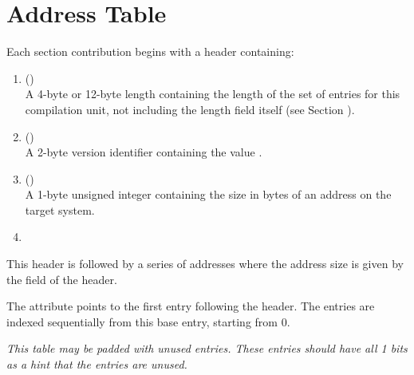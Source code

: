 \section{Address Table}
\label{datarep:addresstable}
Each 
\bb
\dotdebugaddr{} section contribution
\eb
begins with a header containing:
\begin{enumerate}[1. ]
\item \HFNunitlength{} () \\
A 4-byte or 12-byte length containing the length of
the set of entries for this compilation unit, not
including the length field itself
\bb
(see Section ).
\eb

\item  \HFNversion{} (\HFTuhalf) \\
A 2-byte version identifier containing the value
\versiondotdebugaddr{}.

\item	\HFNaddresssize{} (\HFTubyte) \\
A 1-byte unsigned integer containing the size in
bytes of an address
\db
on the target system.

\item	\HFNreservedwassegmentselectorsize{} 
\db
\\

\end{enumerate}

This header is followed by a series of 
\bb
addresses where
\eb
the address size is given by the \HFNaddresssize{}
field of the header. 
\db

The \DWATaddrbase{} attribute points to the first entry
following the header. The entries are indexed sequentially
from this base entry, starting from 0.

\bb
\textit{This table may be padded with unused entries. 
These entries should have all 1 bits as a hint that the 
entries are unused.}
\eb

